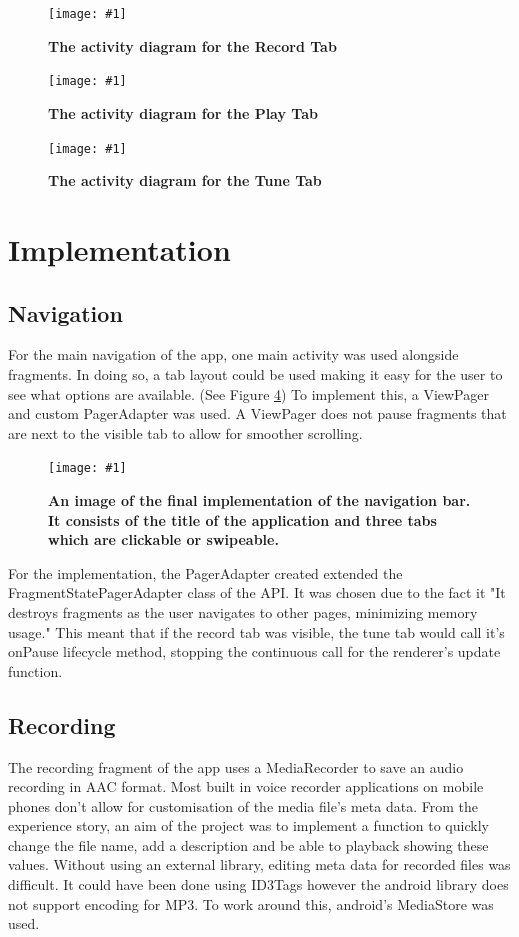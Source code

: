 \documentclass[conference]{acmsiggraph}
\newcommand{\figuremacroF}[3]{
	\begin{figure}[H] %
		\centering
		\texttt{[image: \#1]}
		\caption[#2]{\textbf{#2}}
		\label{fig:#1}
	\end{figure}
}
\begin{document}
\figuremacroF
{RecordTab}
{The activity diagram for the Record Tab}
{1.0}

\figuremacroF
{PlayTab}
{The activity diagram for the Play Tab}
{1.0}

\figuremacroF
{TuneTab}
{The activity diagram for the Tune Tab}
{1.0}
 
\section{Implementation}

\subsection{Navigation}

For the main navigation of the app, one main activity was used alongside fragments. In doing so, a tab layout could be used making it easy for the user to see what options are available. (See Figure \ref{fig:navBar}) To implement this, a ViewPager and custom PagerAdapter was used. A ViewPager does not pause fragments that are next to the visible tab to allow for smoother scrolling.

\figuremacroF
{navBar}
{An image of the final implementation of the navigation bar. It consists of the title of the application and three tabs which are clickable or swipeable.}
{1.0}

For the implementation, the PagerAdapter created extended the FragmentStatePagerAdapter class of the API. It was chosen due to the fact it "It destroys fragments as the user navigates to other pages, minimizing memory usage." \cite{Swipe} This meant that if the record tab was visible, the tune tab would call it's onPause lifecycle method, stopping the continuous call for the renderer's update function.

\subsection{Recording}

The recording fragment of the app uses a MediaRecorder to save an audio recording in AAC format. Most built in voice recorder applications on mobile phones don't allow for customisation of the media file's meta data. From the experience story, an aim of the project was to implement a function to quickly change the file name, add a description and be able to playback showing these values. Without using an external library, editing meta data for recorded files was difficult. It could have been done using ID3Tags however the android library does not support encoding for MP3. \cite{SupportedMedia} To work around this, android's MediaStore was used.
\end{document}
